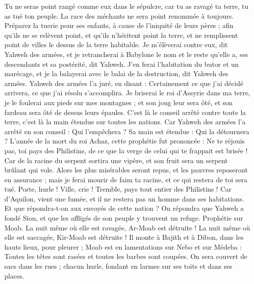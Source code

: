 \begin{multicols}{2}
Tu ne seras point rangé comme eux dans le sépulcre, car tu as ravagé ta terre, tu as tué ton peuple. La race des méchants ne sera point renommée à toujours.
Préparez la tuerie pour ses enfants, à cause de l'iniquité de leurs pères ; afin qu'ils ne se relèvent point, et qu'ils n'héritent point la terre, et ne remplissent point de villes le dessus de la terre habitable.
Je m'élèverai contre eux, dit Yahweh des armées, et je retrancherai à Babylone le nom et le reste qu'elle a, ses descendants et sa postérité, dit Yahweh.
J'en ferai l'habitation du butor et un marécage, et je la balayerai avec le balai de la destruction, dit Yahweh des armées.
Yahweh des armées l'a juré, en disant : Certainement ce que j'ai décidé arrivera, ce que j'ai résolu s'accomplira.
Je briserai le roi d'Assyrie dans ma terre, je le foulerai aux pieds sur mes montagnes ; et son joug leur sera ôté, et son fardeau sera ôté de dessus leurs épaules.
C'est là le conseil arrêté contre toute la terre, c'est là la main étendue sur toutes les nations.
Car Yahweh des armées l'a arrêté en son conseil : Qui l'empêchera ? Sa main est étendue : Qui la détournera ?
L'année de la mort du roi Achaz, cette prophétie fut prononcée : 
Ne te réjouis pas, toi pays des Philistins, de ce que la verge de celui qui te frappait est brisée ! Car de la racine du serpent sortira une vipère, et son fruit sera un serpent brûlant qui vole.
Alors les plus misérables seront repus, et les pauvres reposeront en assurance ; mais je ferai mourir de faim ta racine, et ce qui restera de toi sera tué.
Porte, hurle ! Ville, crie ! Tremble, pays tout entier des Philistins ! Car d'Aquilon, vient une fumée, et il ne restera pas un homme dans ses habitations.
Et que répondra-t-on aux envoyés de cette nation ? On répondra que Yahweh a fondé Sion, et que les affligés de son peuple y trouvent un refuge.
\VerseOne{}Prophétie sur Moab. La nuit même où elle est ravagée, Ar-Moab est détruite ! La nuit même où elle est saccagée, Kir-Moab est détruite !
Il monte à Bajith et à Dibon, dans les hauts lieux, pour pleurer ; Moab est en lamentations sur Nebo et sur Médeba : Toutes les têtes sont rasées et toutes les barbes sont coupées.
On sera couvert de sacs dans les rues ; chacun hurle, fondant en larmes sur ses toits et dans ses places.

\end{multicols}
